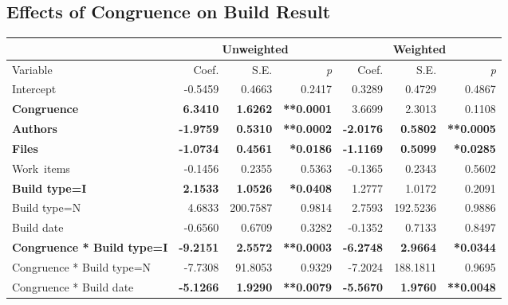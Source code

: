 \subsection{Effects of Congruence on Build Result}
\label{sec:congruence_effect_build_result}

\begin{table}[t]
\begin{center}
\small
\begin{tabular}{l|r@{\hspace{5pt}}r@{\hspace{-5pt}}r|r@{\hspace{5pt}}r@{\hspace{-5pt}}r}
 & \multicolumn{3}{c|}{Unweighted} & \multicolumn{3}{c}{Weighted} \\\hline
Variable & Coef. & S.E. & \emph{p} & Coef. & S.E. & \emph{p} \\
	\hline
Intercept                   &  -0.5459 &   0.4663 & 0.2417 &    0.3289 &    0.4729 &   0.4867 \\
\textbf{Congruence}              &   \textbf{6.3410} &   \textbf{1.6262} & \textbf{**0.0001} &    3.6699 &    2.3013 &   0.1108 \\
\textbf{Authors}                     &  \textbf{-1.9759} &   \textbf{0.5310} & \textbf{**0.0002} &   \textbf{-2.0176} &    \textbf{0.5802} &   \textbf{**0.0005} \\
\textbf{Files}                       &  \textbf{-1.0734} &   \textbf{0.4561} & \textbf{*0.0186} &   \textbf{-1.1169} &    \textbf{0.5099} &   \textbf{*0.0285} \\
Work~items                   &  -0.1456 &   0.2355 & 0.5363 &   -0.1365 &    0.2343 &   0.5602 \\
\textbf{Build type=I}                      &   \textbf{2.1533} &   \textbf{1.0526} & \textbf{*0.0408} &    1.2777 &    1.0172 &   0.2091 \\
Build type=N                      &   4.6833 & 200.7587 & 0.9814 &    2.7593 &  192.5236 &   0.9886 \\
Build date                   &  -0.6560 &   0.6709 & 0.3282 &   -0.1352 &    0.7133 &   0.8497 \\
\textbf{Congruence * Build type=I}     &  \textbf{-9.2151} &   \textbf{2.5572} & \textbf{**0.0003} &   \textbf{-6.2748} &    \textbf{2.9664} &   \textbf{*0.0344} \\
Congruence * Build type=N     &  -7.7308 &  91.8053 & 0.9329 &   -7.2024 &  188.1811 &   0.9695 \\
Congruence * Build date  &  \textbf{-5.1266} &   \textbf{1.9290} & \textbf{**0.0079} &   \textbf{-5.5670} &    \textbf{1.9760} &   \textbf{**0.0048} \\

\end{tabular}
\end{center}
\end{table}
